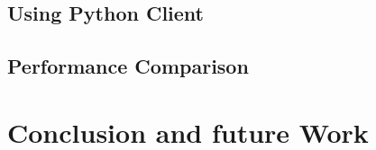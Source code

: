 \documentclass[draft,final]{vutinfth} %
\begin{document}
\section{Using Python Client}
\section{Performance Comparison}

\chapter{Conclusion and future Work}



\backmatter

\listoffigures %

\cleardoublepage %
\listoftables %


\printindex

\printglossaries



\end{document}
